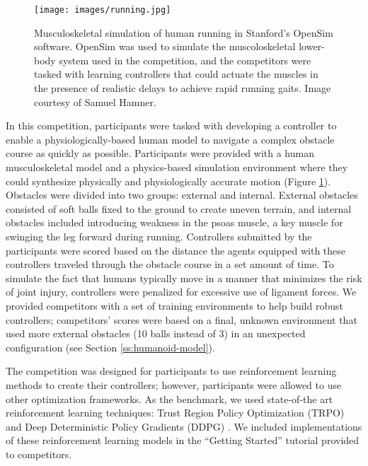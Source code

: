 \documentclass[graybox]{svmult}
\begin{document}
\begin{figure}[ht!]
\centering
\texttt{[image: images/running.jpg]}
\caption{Musculoskeletal simulation of human running in Stanford's OpenSim software. OpenSim was used to simulate the muscoloskeletal lower-body system used in the competition, and the competitors were tasked with learning controllers that could actuate the muscles in the presence of realistic delays to achieve rapid running gaits. Image courtesy of Samuel Hamner.}
\label{fig:running}
\end{figure}

In this competition, participants were tasked with developing a controller to enable a physiologically-based human model to navigate a complex obstacle course as quickly as possible. Participants were provided with a human musculoskeletal model and a physics-based simulation environment where they could synthesize physically and physiologically accurate motion (Figure \ref{fig:running}). Obstacles were divided into two groups: external and internal. External obstacles consisted of soft balls fixed to the ground to create uneven terrain, and internal obstacles included introducing weakness in the psoas muscle, a key muscle for swinging the leg forward during running. Controllers submitted by the participants were scored based on the distance the agents equipped with these controllers traveled through the obstacle course in a set amount of time. 
To simulate the fact that humans typically move in a manner that minimizes the risk of joint injury, controllers were penalized for excessive use of ligament forces. We provided competitors with a set of training environments to help build robust controllers; competitors' scores were based on a final, unknown environment that used more external obstacles (10 balls instead of 3) in an unexpected configuration (see Section \ref{ss:humanoid-model}).

The competition was designed for participants to use reinforcement learning methods to create their controllers; however, participants were allowed to use other optimization frameworks. As the benchmark, we used state-of-the art reinforcement learning techniques: Trust Region Policy Optimization (TRPO) \cite{schulman2015trust} and Deep Deterministic Policy Gradients (DDPG) \cite{lillicrap2015continuous}. We included implementations of these reinforcement learning models in the ``Getting Started'' tutorial provided to competitors.
\end{document}
